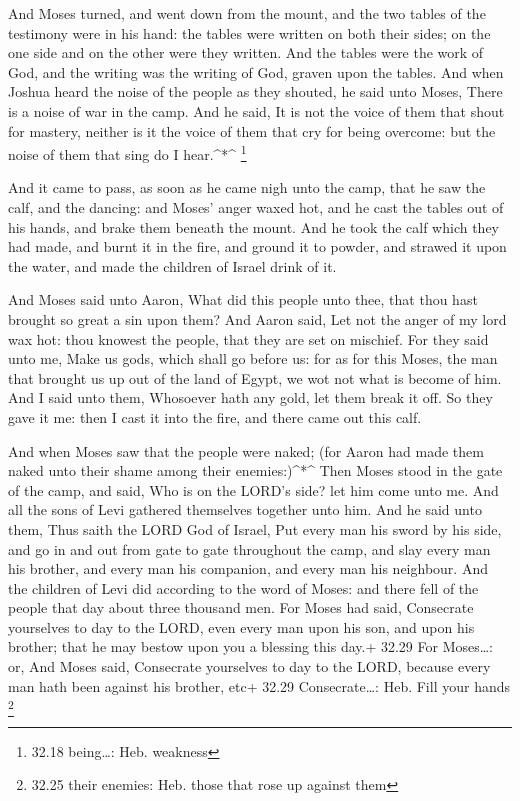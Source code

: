  And Moses turned, and went down from the mount, and the
two tables of the testimony were in his hand: the tables were written on
both their sides; on the one side and on the other were they written.
 And the tables were the work of God, and the writing was
the writing of God, graven upon the tables.  And when
Joshua heard the noise of the people as they shouted, he said unto
Moses, There is a noise of war in the camp.  And he said,
It is not the voice of them that shout for mastery, neither is it the
voice of them that cry for being overcome: but the noise of them that
sing do I hear.\^{}*\^{} \footnote{32.18 being\ldots: Heb. weakness}

 And it came to pass, as soon as he came nigh unto the
camp, that he saw the calf, and the dancing: and Moses' anger waxed hot,
and he cast the tables out of his hands, and brake them beneath the
mount.  And he took the calf which they had made, and burnt
it in the fire, and ground it to powder, and strawed it upon the water,
and made the children of Israel drink of it.

 And Moses said unto Aaron, What did this people unto thee,
that thou hast brought so great a sin upon them?  And Aaron
said, Let not the anger of my lord wax hot: thou knowest the people,
that they are set on mischief.  For they said unto me, Make
us gods, which shall go before us: for as for this Moses, the man that
brought us up out of the land of Egypt, we wot not what is become of
him.  And I said unto them, Whosoever hath any gold, let
them break it off. So they gave it me: then I cast it into the fire, and
there came out this calf.

 And when Moses saw that the people were naked; (for Aaron
had made them naked unto their shame among their enemies:)\^{}*\^{}
 Then Moses stood in the gate of the camp, and said, Who is
on the LORD's side? let him come unto me. And all the sons of Levi
gathered themselves together unto him.  And he said unto
them, Thus saith the LORD God of Israel, Put every man his sword by his
side, and go in and out from gate to gate throughout the camp, and slay
every man his brother, and every man his companion, and every man his
neighbour.  And the children of Levi did according to the
word of Moses: and there fell of the people that day about three
thousand men.  For Moses had said, Consecrate yourselves to
day to the LORD, even every man upon his son, and upon his brother; that
he may bestow upon you a blessing this day.+ 32.29 For Moses\ldots: or,
And Moses said, Consecrate yourselves to day to the LORD, because every
man hath been against his brother, etc+ 32.29 Consecrate\ldots: Heb.
Fill your hands \footnote{32.25 their enemies: Heb. those that rose up
  against them}

